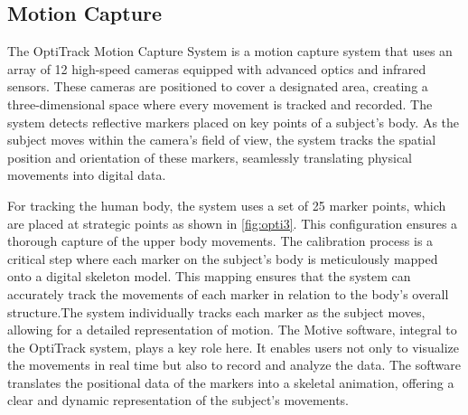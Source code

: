 \subsection*{Motion Capture}
The OptiTrack Motion Capture System is a motion capture system that uses an array of 12 high-speed cameras equipped with advanced optics and infrared sensors. These cameras are positioned to cover a designated area, creating a three-dimensional space where every movement is tracked and recorded. The system detects reflective markers placed on key points of a subject's body. As the subject moves within the camera's field of view, the system tracks the spatial position and orientation of these markers, seamlessly translating physical movements into digital data. 

For tracking the human body, the system uses a set of 25 marker points, which are placed at strategic points as shown in {\autoref{fig:opti3}}. This configuration ensures a thorough capture of the upper body movements. The calibration process is a critical step where each marker on the subject's body is meticulously mapped onto a digital skeleton model. This mapping ensures that the system can accurately track the movements of each marker in relation to the body's overall structure.The system individually tracks each marker as the subject moves, allowing for a detailed representation of motion.
The Motive software, integral to the OptiTrack system, plays a key role here. It enables users not only to visualize the movements in real time but also to record and analyze the data. The software translates the positional data of the markers into a skeletal animation, offering a clear and dynamic representation of the subject's movements.

